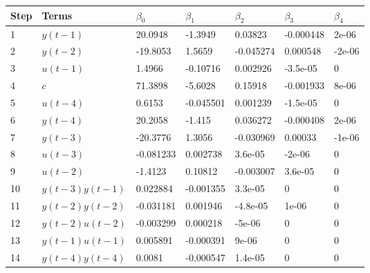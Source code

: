 \begin{tabular}{lllllll}
Step & Terms & $\beta_{0}$ & $\beta_{1}$ & $\beta_{2}$ & $\beta_{3}$ & $\beta_{4}$ \\ 
\hline 
1 & $y(t-1)$ & 20.0948 & -1.3949 & 0.03823 & -0.000448 & 2e-06 \\ 
2 & $y(t-2)$ & -19.8053 & 1.5659 & -0.045274 & 0.000548 & -2e-06 \\ 
3 & $u(t-1)$ & 1.4966 & -0.10716 & 0.002926 & -3.5e-05 & 0 \\ 
4 & $c$ & 71.3898 & -5.6028 & 0.15918 & -0.001933 & 8e-06 \\ 
5 & $u(t-4)$ & 0.6153 & -0.045501 & 0.001239 & -1.5e-05 & 0 \\ 
6 & $y(t-4)$ & 20.2058 & -1.415 & 0.036272 & -0.000408 & 2e-06 \\ 
7 & $y(t-3)$ & -20.3776 & 1.3056 & -0.030969 & 0.00033 & -1e-06 \\ 
8 & $u(t-3)$ & -0.081233 & 0.002738 & 3.6e-05 & -2e-06 & 0 \\ 
9 & $u(t-2)$ & -1.4123 & 0.10812 & -0.003007 & 3.6e-05 & 0 \\ 
10 & $y(t-3)y(t-1)$ & 0.022884 & -0.001355 & 3.3e-05 & 0 & 0 \\ 
11 & $y(t-2)y(t-2)$ & -0.031181 & 0.001946 & -4.8e-05 & 1e-06 & 0 \\ 
12 & $y(t-2)u(t-2)$ & -0.003299 & 0.000218 & -5e-06 & 0 & 0 \\ 
13 & $y(t-1)u(t-1)$ & 0.005891 & -0.000391 & 9e-06 & 0 & 0 \\ 
14 & $y(t-4)y(t-4)$ & 0.0081 & -0.000547 & 1.4e-05 & 0 & 0 \\ 
\hline 
\end{tabular}